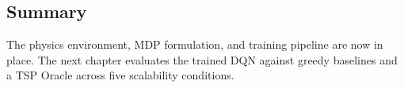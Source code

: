 \subsection{Summary}

The physics environment, MDP formulation, and training pipeline are now in place. The next chapter evaluates the trained DQN against greedy baselines and a TSP Oracle across five scalability conditions.
